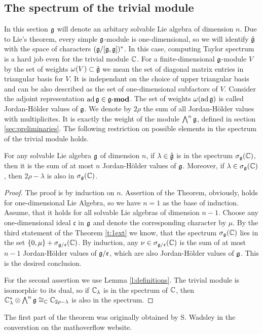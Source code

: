 \subsection{The spectrum of the trivial module}
In this section $\mathfrak{g}$ will denote an arbitary solvable Lie algebra of dimension $n$. Due to Lie's
theorem, every simple $\mathfrak{g}$-module is one-dimensional, so we will identify $\hat{\mathfrak{g}}$ with the
space of characters $(\mathfrak{g}/[\mathfrak{g},\mathfrak{g}])^*$. In this case, computing Taylor spectrum is a hard
job even for the trivial module $\mathbb{C}$. For a finite-dimensional $\mathfrak{g}$-module $V$ by the set of
weights $\omega(V) \subset \hat{\mathfrak{g}}$ we mean the set of diagonal matrix entries in triangular
basis for $V$. It is independant on the choice of upper triangular basis and can be also described
as the set of one-dimensional subfactors of $V$. Consider the adjoint representation $\operatorname{ad}\mathfrak{g} \in
\operatorname{\mathbf{\mathfrak{g}-mod}}$. The set of weights $\omega(\operatorname{ad}\mathfrak{g})$ is called Jordan-H{\"o}lder values of $\mathfrak{g}$.
We denote by $2\rho$ the sum of all Jordan-H{\"o}lder values with multiplicites. It is exactly the
weight of the module $\bigwedge^n\mathfrak{g}$, defined in section \ref{sec:preliminaries}.  The following
restriction on possible elements in the spectrum of the trivial module holds.
\begin{theorem} \label{t:jordanholder}
    For any solvable Lie algebra $\mathfrak{g}$ of dimension $n$, if $\lambda \in \hat{\mathfrak{g}}$ is in the
    spectrum $\sigma_{\mathfrak{g}}(\mathbb{C})$, then it is the sum of at most $n$ Jordan-H{\"o}lder values of
    $\mathfrak{g}$. Moreover, if $\lambda \in \sigma_{\mathfrak{g}}(\mathbb{C})$, then $2\rho - \lambda$ is also in
    $\sigma_{\mathfrak{g}}(\mathbb{C})$.
\end{theorem}
\begin{proof}
    The proof is by induction on $n$. Assertion of the Theorem, obviously, holds for
    one-dimensional Lie Algebra, so we have $n=1$ as the base of induction. Assume, that it holds
    for all solvable Lie algebras of dimension $n-1$. Choose any one-dimensional ideal
    $\mathfrak{c}$ in $\mathfrak{g}$ and denote the corresponding character by $\mu$. By the third
    statement of the Theorem \ref{t:1ext} we know, that the spectrum $\sigma_{\mathfrak{g}}(\mathbb{C})$ lies in
    the set $\{0, \mu\} + \sigma_{\mathfrak{g}/\mathfrak{e}}(\mathbb{C})$. By induction, any $\nu \in
    \sigma_{\mathfrak{g}/\mathfrak{e}}(\mathbb{C})$ is the sum of at most $n-1$ Jordan-H{\"o}lder values of
    $\mathfrak{g}/\mathfrak{e}$, which are also Jordan-H{\"o}lder values of $\mathfrak{g}$. This is the desired
    conclusion.

    For the second assertion we use Lemma \ref{l:definitions}. The trivial module is isomorphic to
    its dual, so if $\mathbb{C}_\lambda$ is in the spectrum of $\mathbb{C}$, then $\mathbb{C}_\lambda^* \otimes
    \bigwedge^n\mathfrak{g} \cong_{\mathbb{C}} \mathbb{C}_{2\rho - \lambda}$ is also in the spectrum.
\end{proof}
The first part of the theorem was originally obtained by S. Wadsley in the converstion on the
mathoverflow website.  

